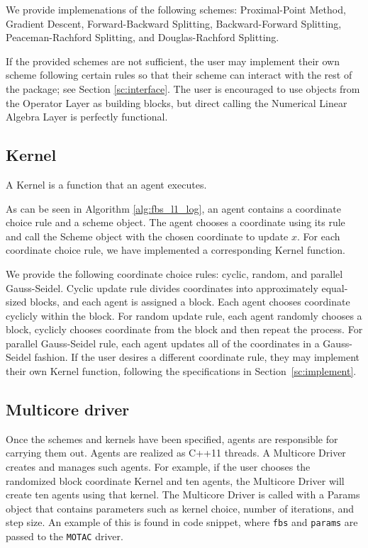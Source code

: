 We provide implemenations of the following schemes:  Proximal-Point Method,  Gradient Descent, Forward-Backward Splitting, Backward-Forward Splitting, Peaceman-Rachford Splitting, and Douglas-Rachford Splitting.

If the provided schemes are not sufficient, the user may implement their own scheme following certain rules so that their scheme can interact with the rest of the package; see Section \ref{sc:interface}.
The user is encouraged to use objects from the Operator Layer as building blocks, but direct calling the Numerical Linear Algebra Layer is perfectly functional. %

\subsection{Kernel}
A Kernel is a function that an agent executes.

As can be seen in Algorithm \ref{alg:fbs_l1_log}, an agent contains a coordinate choice rule and a scheme object.
The agent chooses a coordinate using its rule and call the Scheme object with the chosen coordinate to update $x$.
For each coordinate choice rule, we have implemented a corresponding Kernel function.

We provide the following coordinate choice rules: cyclic, random, and parallel Gauss-Seidel. 
Cyclic update rule divides coordinates into approximately equal-sized blocks, and each agent is assigned a block.
Each agent chooses coordinate cyclicly within the block. 
For random update rule, each agent randomly chooses a block, cyclicly chooses coordinate from the block and then repeat the process.
For parallel Gauss-Seidel rule, each agent updates all of the coordinates in a Gauss-Seidel fashion. 
If the user desires a different coordinate rule, they may implement their own Kernel function, following the specifications in Section~\ref{sc:implement}.


\subsection{Multicore driver}

Once the schemes and kernels have been specified, agents are responsible for carrying them out. Agents are realized as C++11 threads.
A Multicore Driver creates and manages such agents.
For example, if the user chooses the randomized block coordinate Kernel and ten agents, the Multicore Driver will create ten agents using that kernel. %
The Multicore Driver is called with a Params object that contains parameters such as kernel choice, number of iterations, and step size.
An example of this is found in code snippet, where \texttt{fbs} and \texttt{params} are passed to the \texttt{MOTAC} driver.

